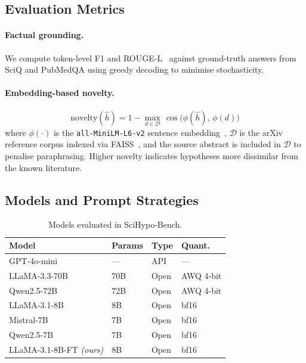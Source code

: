 \documentclass{article}
\begin{document}
\subsection{Evaluation Metrics}
\label{sec:metrics}

\paragraph{Factual grounding.}
We compute token-level F1 and ROUGE-L~\cite{lin2004rouge} against
ground-truth answers from SciQ and PubMedQA using greedy decoding to
minimise stochasticity.

\paragraph{Embedding-based novelty.}
\begin{equation}
  \text{novelty}(\hat{h})
  = 1 - \max_{d \in \mathcal{D}}\,
    \cos\!\bigl(\phi(\hat{h}),\,\phi(d)\bigr)
  \label{eq:novelty}
\end{equation}
where $\phi(\cdot)$ is the \texttt{all-MiniLM-L6-v2} sentence
embedding~\cite{reimers2019sentence}, $\mathcal{D}$ is the arXiv reference
corpus indexed via FAISS~\cite{johnson2019billion}, and the source abstract
is included in $\mathcal{D}$ to penalise paraphrasing.
Higher novelty indicates hypotheses more dissimilar from the known literature.

\subsection{Models and Prompt Strategies}

\begin{table}[h]
\centering\small
\caption{Models evaluated in SciHypo-Bench.}
\label{tab:models}
\setlength{\tabcolsep}{4pt}
\begin{tabular}{llll}
\toprule
\textbf{Model} & \textbf{Params} & \textbf{Type} & \textbf{Quant.}\\
\midrule
GPT-4o-mini         & ---  & API  & ---       \\
LLaMA-3.3-70B       & 70B  & Open & AWQ 4-bit \\
Qwen2.5-72B         & 72B  & Open & AWQ 4-bit \\
LLaMA-3.1-8B        & 8B   & Open & bf16      \\
Mistral-7B          & 7B   & Open & bf16      \\
Qwen2.5-7B          & 7B   & Open & bf16      \\
\midrule
LLaMA-3.1-8B-FT \textit{(ours)} & 8B & Open & bf16 \\
\bottomrule
\end{tabular}
\end{table}
\end{document}
